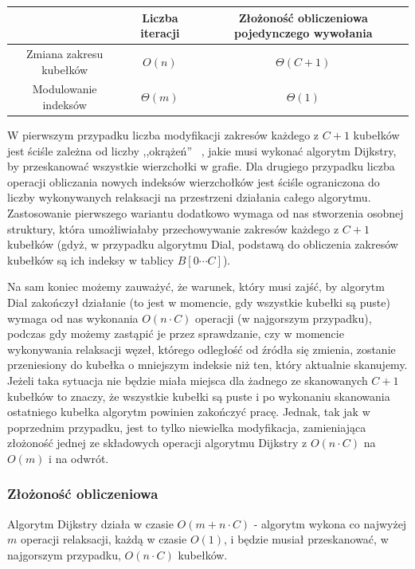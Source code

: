 \begin{center}
	\begin{tabular}{ccc}
		& Liczba iteracji & Złożoność obliczeniowa pojedynczego wywołania \\
		\hline
		Zmiana zakresu kubełków & $ O \left( n \right) $ & $ \Theta \left( C + 1 \right) $ \\
		Modulowanie indeksów & $ \Theta \left( m \right) $ & $ \Theta \left( 1 \right) $ \\
		\hline
	\end{tabular}
\end{center}

W pierwszym przypadku liczba modyfikacji zakresów każdego z $C+1$ kubełków jest ściśle zależna od liczby ,,okrążeń''~ , jakie musi wykonać algorytm Dijkstry, by przeskanować wszystkie wierzchołki w grafie. Dla drugiego przypadku liczba operacji obliczania nowych indeksów wierzchołków jest ściśle ograniczona do liczby wykonywanych relaksacji na przestrzeni działania całego algorytmu. Zastosowanie pierwszego wariantu dodatkowo wymaga od nas stworzenia osobnej struktury, która umożliwiałaby przechowywanie zakresów każdego z $C+1$ kubełków (gdyż, w przypadku algorytmu Dial, podstawą do obliczenia zakresów kubełków są ich indeksy w tablicy $ B \left[ 0 \cdots C \right]$).

Na sam koniec możemy zauważyć, że warunek, który musi zajść, by algorytm Dial zakończył działanie (to jest w momencie, gdy wszystkie kubełki są puste) wymaga od nas wykonania $ O \left( n \cdot C \right)$ operacji (w najgorszym przypadku), podczas gdy możemy zastąpić je przez sprawdzanie, czy w momencie wykonywania relaksacji węzeł, którego odległość od źródła się zmienia, zostanie przeniesiony do kubełka o mniejszym indeksie niż ten, który aktualnie skanujemy. Jeżeli taka sytuacja nie będzie miała miejsca dla żadnego ze skanowanych $C+1$ kubełków to znaczy, że wszystkie kubełki są puste i po wykonaniu skanowania ostatniego kubełka algorytm powinien zakończyć pracę. Jednak, tak jak w poprzednim przypadku, jest to tylko niewielka modyfikacja, zamieniająca złożoność jednej ze składowych operacji algorytmu Dijkstry z $ O \left( n \cdot C \right)$ na $ O \left( m \right)$ i na odwrót.

\subsubsection{Złożoność obliczeniowa}

Algorytm Dijkstry działa w czasie $O \left( m + n \cdot C \right)$ - algorytm wykona co najwyżej $m$ operacji relaksacji, każdą w czasie $O \left( 1 \right)$, i będzie musiał przeskanować, w najgorszym przypadku, $O \left( n \cdot C \right)$ kubełków.


